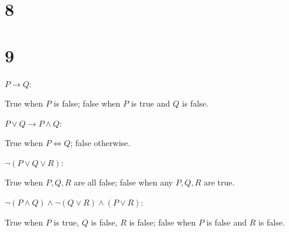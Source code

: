 \documentclass[10pt]{article}
\begin{document}

\section*{8}


\section*{9}
\begin{description*}
  \item[$P\to Q$:] 

  True when $P$ is false; false when $P$ is true and $Q$ is false.

  \item[$P \lor Q \to P \land Q$:]

  True when $P\iff Q$; false otherwise.

  \item[$\lnot (P \lor Q \lor R)$:]

  True when $P,Q,R$ are all false; false when any $P,Q,R$ are true.

  \item[$\lnot (P \land Q) \land \lnot (Q \lor R) \land (P\lor R)$:]

  True when $P$ is true, $Q$ is false, $R$ is false; false when $P$ is false and $R$ is false.


\end{description*}
\end{document}
